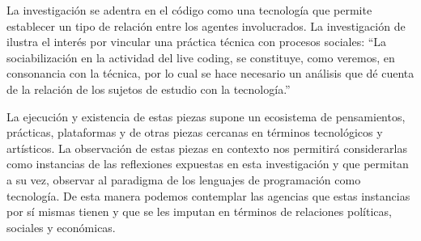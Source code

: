 
La investigación se adentra en el código como una tecnología que permite establecer un tipo de relación entre los agentes involucrados. La investigación de \cite{diProspero} ilustra el interés por vincular una práctica técnica con procesos sociales: ``La sociabilización en la actividad del live coding, se constituye, como veremos, en consonancia con la técnica, por lo cual se hace necesario un análisis que dé cuenta de la relación de los sujetos de estudio con la tecnología.''\citep[p.~48]{diProspero}


La ejecución y existencia de estas piezas supone un ecosistema de pensamientos, prácticas, plataformas y de otras piezas cercanas en términos tecnológicos y artísticos. La observación de estas piezas en contexto nos permitirá considerarlas como instancias de las reflexiones expuestas en esta investigación y que permitan a su vez, observar al paradigma de los lenguajes de programación como tecnología. De esta manera podemos contemplar las agencias que estas instancias por sí mismas tienen y que se les imputan en términos de relaciones políticas, sociales y económicas.




